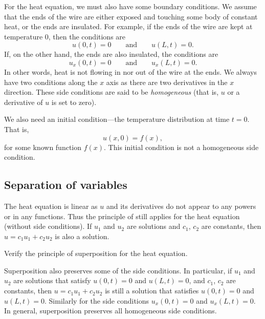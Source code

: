 For the heat equation, we must also have some
boundary conditions.
We assume that the ends of the wire are either exposed 
and touching some body of constant heat, or the ends are insulated.
For example, if the ends of the wire are kept at temperature 0, then
the conditions are
\begin{equation*}
u(0,t) = 0 \qquad \text{and} \qquad u(L,t) = 0.
\end{equation*}
If, on the other hand, the ends are also insulated, the conditions are
\begin{equation*}
u_x(0,t) = 0 \qquad \text{and} \qquad
u_x(L,t) = 0 .
\end{equation*}
In other words, heat is not flowing in nor out of the wire at the ends.
We always have two conditions along the $x$ axis as there are
two derivatives in the $x$ direction.
These side conditions are said to be
\emph{homogeneous}
(that is, $u$ or a derivative of $u$ is set to zero).

We also need an initial condition---the temperature distribution
at time $t=0$.  That is,
\begin{equation*}
u(x,0) = f(x) ,
\end{equation*}
for some known function $f(x)$.
This initial condition is not a homogeneous side condition.

\subsection{Separation of variables}

The heat equation is linear as $u$ and its derivatives do not
appear to any powers or in any functions.
Thus the principle of  still applies for
the heat equation
(without side conditions).
If $u_1$ and $u_2$ are
solutions and $c_1$, $c_2$ are constants, then
$u = c_1 u_1 + c_2 u_2$ is also a solution.

\begin{exercise}
Verify the principle of superposition for the heat equation.
\end{exercise}

Superposition also preserves some of the side conditions.  In particular,
if $u_1$ and $u_2$ are
solutions that satisfy $u(0,t) = 0$ and $u(L,t) = 0$,
and $c_1$, $c_2$ are constants, then
$u = c_1 u_1 + c_2 u_2$ is still a solution
that satisfies $u(0,t) = 0$ and $u(L,t) = 0$.  Similarly
for the side conditions $u_x(0,t) = 0$ and $u_x(L,t) = 0$.  In general,
superposition preserves all homogeneous side conditions.

